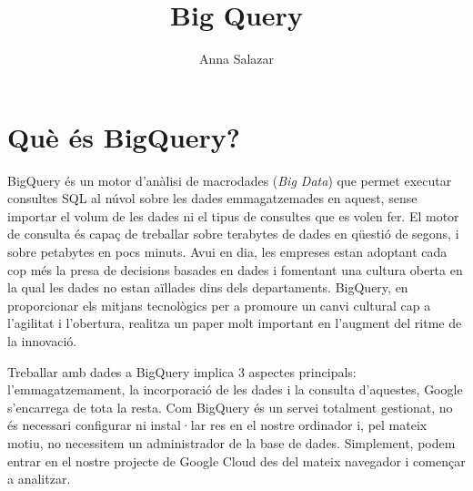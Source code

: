 \documentclass[11pt,longbibliography]{article}
\title{Big Query}
\author{Anna Salazar}
\theoremstyle{definition}
\theoremstyle{remark}
\begin{document}
\begin{titlepage}

\maketitle

\vspace{140mm}

\par
{}%
\hfill
{}%
\par

\end{titlepage}

\tableofcontents

\pagebreak


\section{Què és BigQuery?}

BigQuery és un motor d’anàlisi de macrodades (\textit{Big Data}) que permet executar consultes SQL al núvol sobre les dades emmagatzemades en aquest, sense importar el volum de les dades ni el tipus de consultes que es volen fer. El motor de consulta és capaç de treballar sobre terabytes de dades en qüestió de segons, i sobre petabytes en pocs minuts. Avui en dia, les empreses estan adoptant cada cop més la presa de decisions basades en dades i fomentant una cultura oberta en la qual les dades no estan aïllades dins dels departaments. BigQuery, en proporcionar els mitjans tecnològics per a promoure un canvi cultural cap a l’agilitat i l’obertura, realitza un paper molt important en l’augment del ritme de la innovació.


Treballar amb dades a BigQuery implica 3 aspectes principals: l’emmagatzemament, la incorporació de les dades i la consulta d’aquestes, Google s’encarrega de tota la resta. Com BigQuery és un servei totalment gestionat, no és necessari configurar ni instal·lar res en el nostre ordinador i, pel mateix motiu, no necessitem un administrador de la base de dades. Simplement, podem entrar en el nostre projecte de Google Cloud des del mateix navegador i començar a analitzar.
\end{document}
